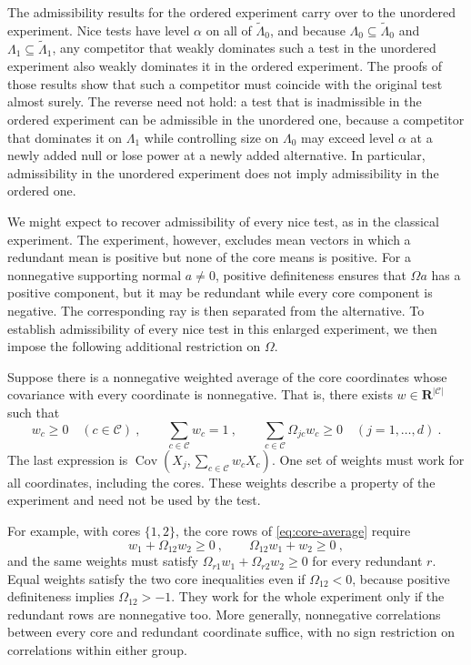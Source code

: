 \documentclass[11pt]{article}
\newcommand{\red}[1]{{\color{red}#1}} %
\numberwithin{equation}{section}
\theoremstyle{definition}
\begin{document}
The admissibility results for the ordered experiment carry over to the unordered experiment. Nice tests have level $\alpha$ on all of $\widetilde\Lambda_0$, and because $\Lambda_0\subseteq\widetilde\Lambda_0$ and $\Lambda_1\subseteq\widetilde\Lambda_1$, any competitor that weakly dominates such a test in the unordered experiment also weakly dominates it in the ordered experiment. The proofs of those results show that such a competitor must coincide with the original test almost surely. The reverse need not hold: a test that is inadmissible in the ordered experiment can be admissible in the unordered one, because a competitor that dominates it on $\Lambda_1$ while controlling size on $\Lambda_0$ may exceed level $\alpha$ at a newly added null or lose power at a newly added alternative. \red{In particular, admissibility in the unordered experiment does not imply admissibility in the ordered one.}

We might expect to recover admissibility of every nice test, as in the classical experiment. The experiment, however, excludes mean vectors in which a redundant mean is positive but none of the core means is positive. For a nonnegative supporting normal $a\ne0$, positive definiteness ensures that $\Omega a$ has a positive component, but it may be redundant while every core component is negative. The corresponding ray is then separated from the alternative. To establish admissibility of every nice test in this enlarged experiment, we then impose the following additional restriction on $\Omega$.

Suppose there is a nonnegative weighted average of the core coordinates whose covariance with every coordinate is nonnegative. That is, there exists $w\in\mathbf R^{|\mathcal C|}$ such that
\begin{equation}\label{eq:core-average}
w_c\ge0\quad(c\in\mathcal C)~,
\qquad\sum_{c\in\mathcal C}w_c=1~,
\qquad\sum_{c\in\mathcal C}\Omega_{jc}w_c\ge0\quad(j=1,\dots,d)~.
\end{equation}
The last expression is $\operatorname{Cov}(X_j,\sum_{c\in\mathcal C}w_cX_c)$. One set of weights must work for all coordinates, including the cores. These weights describe a property of the experiment and need not be used by the test.

For example, with cores $\{1,2\}$, the core rows of \eqref{eq:core-average} require
\[
w_1+\Omega_{12}w_2\ge0~,
\qquad\Omega_{12}w_1+w_2\ge0~,
\]
and the same weights must satisfy $\Omega_{r1}w_1+\Omega_{r2}w_2\ge0$ for every redundant $r$. Equal weights satisfy the two core inequalities even if $\Omega_{12}<0$, because positive definiteness implies $\Omega_{12}>-1$. They work for the whole experiment only if the redundant rows are nonnegative too. More generally, nonnegative correlations between every core and redundant coordinate suffice, with no sign restriction on correlations within either group. 
\end{document}
